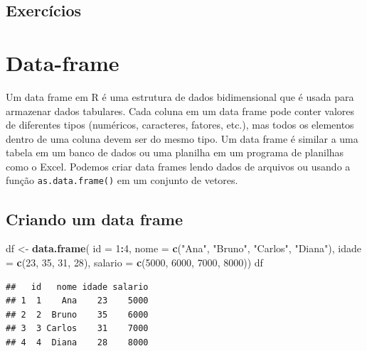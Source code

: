 \documentclass[
]{book}
\newenvironment{Shaded}{\begin{snugshade}}{\end{snugshade}}
\newcommand{\AttributeTok}[1]{\textcolor[rgb]{0.13,0.29,0.53}{#1}}
\newcommand{\DecValTok}[1]{\textcolor[rgb]{0.00,0.00,0.81}{#1}}
\newcommand{\FunctionTok}[1]{\textcolor[rgb]{0.13,0.29,0.53}{\textbf{#1}}}
\newcommand{\NormalTok}[1]{#1}
\newcommand{\OtherTok}[1]{\textcolor[rgb]{0.56,0.35,0.01}{#1}}
\newcommand{\SpecialCharTok}[1]{\textcolor[rgb]{0.81,0.36,0.00}{\textbf{#1}}}
\newcommand{\StringTok}[1]{\textcolor[rgb]{0.31,0.60,0.02}{#1}}
\begin{document}
\subsection{Exercícios}\label{exercuxedcios-2}

\section{Data-frame}\label{data-frame}

Um data frame em R é uma estrutura de dados bidimensional que é usada para armazenar dados tabulares. Cada coluna em um data frame pode conter valores de diferentes tipos (numéricos, caracteres, fatores, etc.), mas todos os elementos dentro de uma coluna devem ser do mesmo tipo. Um data frame é similar a uma tabela em um banco de dados ou uma planilha em um programa de planilhas como o Excel. Podemos criar data frames lendo dados de arquivos ou usando a função \texttt{as.data.frame()} em um conjunto de vetores.

\subsection{Criando um data frame}\label{criando-um-data-frame}

\begin{Shaded}
\begin{Highlighting}[]
\NormalTok{df }\OtherTok{\textless{}{-}} \FunctionTok{data.frame}\NormalTok{(}
\AttributeTok{id =} \DecValTok{1}\SpecialCharTok{:}\DecValTok{4}\NormalTok{,}
\AttributeTok{nome =} \FunctionTok{c}\NormalTok{(}\StringTok{"Ana"}\NormalTok{, }\StringTok{"Bruno"}\NormalTok{, }\StringTok{"Carlos"}\NormalTok{, }\StringTok{"Diana"}\NormalTok{),}
\AttributeTok{idade =} \FunctionTok{c}\NormalTok{(}\DecValTok{23}\NormalTok{, }\DecValTok{35}\NormalTok{, }\DecValTok{31}\NormalTok{, }\DecValTok{28}\NormalTok{),}
\AttributeTok{salario =} \FunctionTok{c}\NormalTok{(}\DecValTok{5000}\NormalTok{, }\DecValTok{6000}\NormalTok{, }\DecValTok{7000}\NormalTok{, }\DecValTok{8000}\NormalTok{))}
\NormalTok{df}
\end{Highlighting}
\end{Shaded}

\begin{verbatim}
##   id   nome idade salario
## 1  1    Ana    23    5000
## 2  2  Bruno    35    6000
## 3  3 Carlos    31    7000
## 4  4  Diana    28    8000
\end{verbatim}
\end{document}
